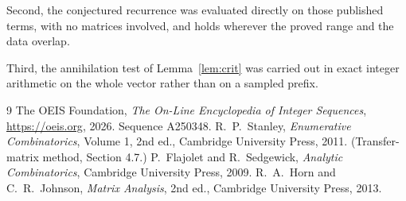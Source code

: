 \documentclass[11pt,a4paper]{article}
\theoremstyle{plain}
\theoremstyle{definition}
\begin{document}
Second, the conjectured recurrence was evaluated directly on those published terms, with no
matrices involved, and holds wherever the proved range and the data overlap.

Third, the annihilation test of Lemma~\ref{lem:crit} was carried out in exact integer
arithmetic on the whole vector rather than on a sampled prefix.

\begin{thebibliography}{9}
 The OEIS Foundation, \emph{The On-Line Encyclopedia of Integer
Sequences}, \url{https://oeis.org}, 2026. Sequence A250348.
 R.~P.~Stanley, \emph{Enumerative Combinatorics}, Volume 1, 2nd ed.,
Cambridge University Press, 2011. (Transfer-matrix method, Section 4.7.)
 P.~Flajolet and R.~Sedgewick, \emph{Analytic Combinatorics}, Cambridge
University Press, 2009.
 R.~A.~Horn and C.~R.~Johnson, \emph{Matrix Analysis}, 2nd ed., Cambridge
University Press, 2013.
\end{thebibliography}
\end{document}
